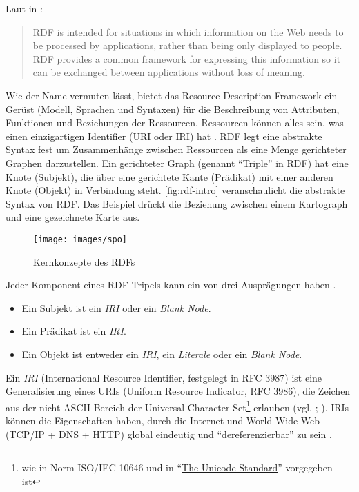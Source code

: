 Laut \citeauthor{Schreiber:14:RP} in : 

\hyphenblockquote{german}{RDF is intended for situations in which information on the Web needs to be processed by applications, rather than being only displayed to people. RDF provides a common framework for expressing this information so it can be exchanged between applications without loss of meaning.} 

Wie der Name vermuten lässt, bietet das Resource Description Framework ein Gerüst (Modell, Sprachen und Syntaxen) für die Beschreibung von Attributen, Funktionen und Beziehungen der Ressourcen. Ressourcen können alles sein, was einen einzigartigen Identifier (URI oder IRI) hat \parencite[vgl.][Folie~6]{Dekeyzer2013}. RDF legt eine abstrakte Syntax fest um Zusammenhänge zwischen Ressourcen als eine Menge gerichteter Graphen darzustellen. Ein gerichteter Graph (genannt \hyphenquote{german}{Triple} in RDF) hat eine Knote (Subjekt), die über eine gerichtete Kante (Prädikat) mit einer anderen Knote (Objekt) in Verbindung steht. \autoref{fig:rdf-intro} veranschaulicht die abstrakte Syntax von RDF. Das Beispiel\footnotemark{} drückt die Beziehung zwischen einem Kartograph und eine gezeichnete Karte aus.


\begin{figure}[h]
	\centering
	\texttt{[image: images/spo]}
	\caption[Kernkonzepte des RDFs]{Kernkonzepte des RDFs}
	\label{fig:spo}
\end{figure}

Jeder Komponent eines RDF-Tripels kann ein von drei Ausprägungen haben \parencite[vgl.][Abs.~3.1]{Wood:14:RCA}.

\begin{itemize}
	\item Ein Subjekt ist ein \textit{IRI} oder ein \textit{Blank Node}.
	\item Ein Prädikat ist ein \textit{IRI}.
	\item Ein Objekt ist entweder ein \textit{IRI}, ein \textit{Literale} oder ein \textit{Blank Node}.
\end{itemize}

Ein \textit{IRI} (International Resource Identifier, festgelegt in RFC 3987) ist eine Generalisierung eines URIs (Uniform Resource Indicator, RFC 3986), die Zeichen aus der nicht-ASCII Bereich der Universal Character Set\footnote{wie in Norm ISO/IEC 10646 und in \hyphenquote{german}{\href{http://www.unicode.org/versions/latest}{The Unicode Standard}} vorgegeben ist} erlauben (vgl. \cite[][Abs~3.2]{Schreiber:14:RP}; \cite[]{rfc3987}). IRIs können die Eigenschaften haben, durch die Internet und World Wide Web (TCP/IP + DNS + HTTP) global eindeutig und \hyphenquote{german}{dereferenzierbar} zu sein \parencite[vgl.][Abs.~2]{Jacobs:04:AWW}. 


